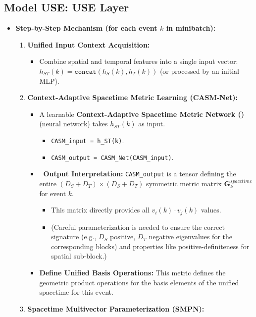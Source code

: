 \documentclass[11pt]{article}
\newcommand{\Ds}{D_S} %
\newcommand{\Dt}{D_T} %
\newcommand{\Hs}{h_S} %
\newcommand{\Ht}{h_T} %
\newcommand{\Hst}{h_{ST}} %
\newcommand{\CASMnet}{\text{CASM-Net}}
\newenvironment{modeldescription}[1]{%
    \subsection*{Model #1: \MakeUppercase{#1} Layer}%
    \begin{itemize}[leftmargin=*,noitemsep]%
}{%
    \end{itemize}%
}
\begin{document}
\begin{modeldescription}{USE}
    \item \textbf{Step-by-Step Mechanism (for each event $k$ in minibatch):}
    \begin{enumerate}[noitemsep]
        \item \textbf{Unified Input Context Acquisition:}
            \begin{itemize}[noitemsep]
                \item Combine spatial and temporal features into a single input vector: $\Hst(k) = \texttt{concat}(\Hs(k), \Ht(k))$ (or processed by an initial MLP).
            \end{itemize}
        \item \textbf{Context-Adaptive Spacetime Metric Learning (CASM-Net):}
        \begin{itemize}[noitemsep]
            \item A learnable \textbf{Context-Adaptive Spacetime Metric Network (\CASMnet)} (neural network) takes $\Hst(k)$ as input.
                \begin{itemize}[noitemsep]
                    \item \texttt{CASM\_input = \Hst(k)}.
                    \item \texttt{CASM\_output = CASM\_Net(CASM\_input)}.
                \end{itemize}
            \item \textbf{\CASMnet \ Output Interpretation:} \texttt{CASM\_output} is a tensor defining the entire $(\Ds+\Dt) \times (\Ds+\Dt)$ symmetric metric matrix $\mathbf{G}_k^{spacetime}$ for event $k$.
                \begin{itemize}[noitemsep]
                    \item This matrix directly provides all $v_i(k) \cdot v_j(k)$ values.
                    \item (Careful parameterization is needed to ensure the correct signature (e.g., $\Ds$ positive, $\Dt$ negative eigenvalues for the corresponding blocks) and properties like positive-definiteness for spatial sub-block.)
                \end{itemize}
            \item \textbf{Define Unified Basis Operations:} This metric defines the geometric product operations for the basis elements of the unified spacetime for this event.
        \end{itemize}
        \item \textbf{Spacetime Multivector Parameterization (SMPN):}
        \begin{itemize}[noitemsep]

\end{itemize}
\end{enumerate}
\end{modeldescription}
\end{document}
